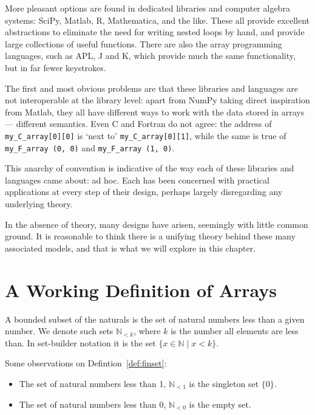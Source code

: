 \documentclass{DIKU-report-variant}
\newcommand\Nat{\mathbb{N}}
\begin{document}
More pleasant options are found in dedicated libraries and computer algebra systems: SciPy, Matlab,
R, Mathematica, and the like. These all provide excellent abstractions 
to eliminate the need for writing nested loops by hand, and provide
large collections of useful functions.
There are also the array programming languages, such as APL, J and K, which provide
much the same functionality, but in far fewer keystrokes.

The first and most obvious problems are that these libraries and languages are not interoperable
at the library level: apart from NumPy taking direct inspiration from Matlab, they
all have different ways to work with the data stored in arrays --- different semantics.
Even C and Fortran do not agree: the address of \texttt{my\_C\_array[0][0]} is `next
to' \texttt{my\_C\_array[0][1]}, while the same is true of \texttt{my\_F\_array (0, 0)}
and \texttt{my\_F\_array (1, 0)}.

This anarchy of convention is indicative of the way each of these libraries and
languages came about: ad hoc. Each has been concerned with practical applications
at every step of their design, perhaps largely disregarding any underlying theory.

In the absence of theory, many designs have arisen, seemingly with little common
ground. It is reasonable to think there is a unifying theory behind these many associated
models, and that is what we will explore in this chapter.

\section{A Working Definition of Arrays}

\begin{definition}
  \label{def:finset}
  A bounded subset of the naturals is
  the set of natural numbers less than a given number.
  We denote such sets \(\Nat_{<k}\), where \(k\) is the number
  all elements are less than. In set-builder notation it is the set \(\{ x \in \Nat \mid x < k \}\).
\end{definition}
\begin{observation}
  \label{ob:finset}
  Some observations on Defintion~\ref{def:finset}:
  \begin{itemize}
    \item The set of natural numbers less than 1, \(\Nat_{<1}\) is the singleton set \(\{0\}\).
    \item The set of natural numbers less than 0, \(\Nat_{<0}\) is the empty set.
  \end{itemize}
\end{observation}
\end{document}
